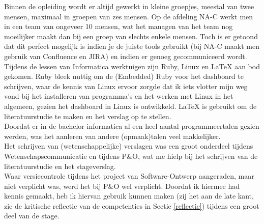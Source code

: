 \documentclass[10pt,a4paper]{article}
\begin{document}
Binnen de opleiding wordt er altijd gewerkt in kleine groepjes, meestal van twee mensen, maximaal in groepen van zes mensen. Op de afdeling NA-C werkt men in een team van ongeveer 10 mensen, wat het managen van het team nog moeilijker maakt dan bij een groep van slechts enkele mensen. Toch is er getoond dat dit perfect mogelijk is indien je de juiste tools gebruikt (bij NA-C maakt men gebruik van Confluence en JIRA) en indien er genoeg gecommuniceerd wordt.\\
Tijdens de lessen van Informatica werktuigen zijn Ruby, Linux en LaTeX aan bod gekomen. Ruby bleek nuttig om de (Embedded) Ruby voor het dashboard te schrijven, waar de kennis van Linux ervoor zorgde dat ik iets vlotter mijn weg vond bij het installeren van programma's en het werken met Linux in het algemeen, gezien het dashboard in Linux is ontwikkeld. LaTeX is gebruikt om de literatuurstudie te maken en het verslag op te stellen.\\
Doordat er in de bachelor informatica al een heel aantal programmeertalen gezien werden, was het aanleren van andere (opmaak)talen veel makkelijker. \\
Het schrijven van (wetenschappelijke) verslagen was een groot onderdeel tijdens Wetenschapscommunicatie en tijdens P\&O, wat me hielp bij het schrijven van de literatuurstudie en het stageverslag.\\
Waar versiecontrole tijdens het project van Software-Ontwerp aangeraden, maar niet verplicht was, werd het bij P\&O wel verplicht. Doordat ik hiermee had kennis gemaakt, heb ik hiervan gebruik kunnen maken (zij het aan de late kant, zie de kritische reflectie van de competenties in Sectie \ref{reflectie}) tijdens een groot deel van de stage. 
\end{document}
